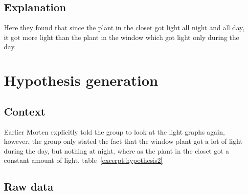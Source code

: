 \subsection{Explanation}
Here they found that since the plant in the closet got light all night and all day, it got more light than the plant in the window which got light only during the day.

\section{Hypothesis generation}

\subsection{Context}
Earlier Morten explicitly told the group to look at the light graphs again, however, the group only stated the fact that the window plant got a lot of light during the day, but nothing at night, where as the plant in the closet got a constant amount of light.
table~\ref{excerpt:hypothesis2} 

\subsection{Raw data}

